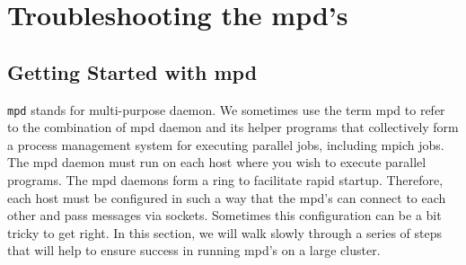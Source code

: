 \documentclass[dvipdfm,11pt]{article}
\begin{document}
\appendix


\section{Troubleshooting the mpd's}
\label{app:mpd}



\subsection{Getting Started with mpd}
\label{sec:getting-started}

\texttt{mpd} stands for multi-purpose daemon.  We sometimes use the term
mpd to refer to the combination of mpd daemon and its helper programs that
collectively form a process management system for executing
parallel jobs, including mpich jobs.  The mpd daemon must
run on each host where you wish to execute parallel programs.
The mpd daemons form a ring to facilitate rapid startup.
Therefore, each host must be configured in such a way that the
mpd's can connect to each other and pass messages via sockets.
Sometimes this configuration can be a bit tricky to get right.
In this section, we will walk slowly through a series of steps
that will help to ensure success in running mpd's on a large cluster.
\end{document}
